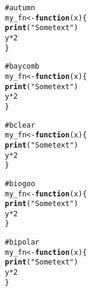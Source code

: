 \documentclass[12pt]{article}\usepackage{graphicx, color}
\makeatletter
\newcommand{\hlfunctioncall}[1]{\textcolor[rgb]{0.188235294117647,0.650980392156863,0.188235294117647}{\textbf{#1}}}%
\newcommand{\hlstring}[1]{\textcolor[rgb]{0.850980392156863,1,0.466666666666667}{#1}}%
\newcommand{\hlcomment}[1]{\textcolor[rgb]{0.533333333333333,0.533333333333333,0.533333333333333}{#1}}%
\newenvironment{kframe}{%
 \def\at@end@of@kframe{}%
 \ifinner\ifhmode%
  \def\at@end@of@kframe{\end{minipage}}%
  \begin{minipage}{\columnwidth}%
 \fi\fi%
 \def\FrameCommand##1{\hskip\@totalleftmargin \hskip-\fboxsep
 \colorbox{shadecolor}{##1}\hskip-\fboxsep
     \hskip-\linewidth \hskip-\@totalleftmargin \hskip\columnwidth}%
 \MakeFramed {\advance\hsize-\width
   \@totalleftmargin\z@ \linewidth\hsize
   \@setminipage}}%
 {\par\unskip\endMakeFramed%
 \at@end@of@kframe}
\newenvironment{knitrout}{}{} %
\makeatother
\begin{document}
\begin{knitrout}
\color{fgcolor}\begin{kframe}
\begin{alltt}
\hlcomment{# autumn}
my_fn <- \hlfunctioncall{function}(x) \{
    \hlfunctioncall{print}(\hlstring{"Some text"})
    y * 2
\}
\end{alltt}
\end{kframe}
\end{knitrout}





\begin{knitrout}
\color{fgcolor}\begin{kframe}
\begin{alltt}
\hlcomment{# baycomb}
my_fn <- \hlfunctioncall{function}(x) \{
    \hlfunctioncall{print}(\hlstring{"Some text"})
    y * 2
\}
\end{alltt}
\end{kframe}
\end{knitrout}





\begin{knitrout}
\color{fgcolor}\begin{kframe}
\begin{alltt}
\hlcomment{# bclear}
my_fn <- \hlfunctioncall{function}(x) \{
    \hlfunctioncall{print}(\hlstring{"Some text"})
    y * 2
\}
\end{alltt}
\end{kframe}
\end{knitrout}





\begin{knitrout}
\color{fgcolor}\begin{kframe}
\begin{alltt}
\hlcomment{# biogoo}
my_fn <- \hlfunctioncall{function}(x) \{
    \hlfunctioncall{print}(\hlstring{"Some text"})
    y * 2
\}
\end{alltt}
\end{kframe}
\end{knitrout}





\begin{knitrout}
\color{fgcolor}\begin{kframe}
\begin{alltt}
\hlcomment{# bipolar}
my_fn <- \hlfunctioncall{function}(x) \{
    \hlfunctioncall{print}(\hlstring{"Some text"})
    y * 2
\}
\end{alltt}
\end{kframe}
\end{knitrout}
\end{document}
